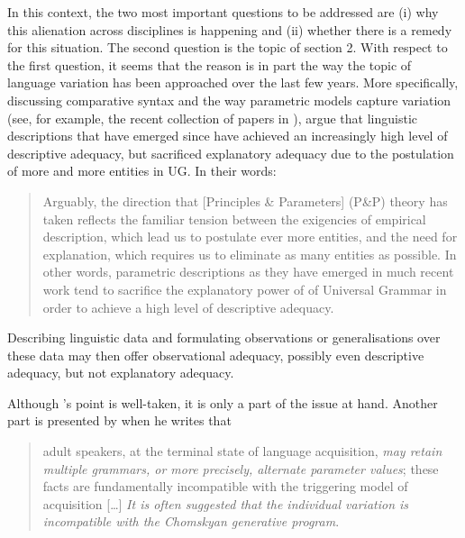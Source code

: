 \documentclass[output=paper]{langsci/langscibook}
\begin{document}
In this context, the two most important questions to be addressed are (i) why
this alienation across disciplines is happening and (ii) whether there is a
remedy for this situation. The second question is the topic of section 2. With
respect to the first question, it seems that the reason is in part the way the
topic of language variation has been approached over the last few years. More
specifically, discussing comparative syntax and the way parametric models
capture variation (see, for example, the recent collection of papers in
\citealt{FábregasEtAl2015}), \citet{BibHolRobShee2014} argue that linguistic
descriptions that have emerged since \citet{Chomsky1981} have achieved an
increasingly high level of descriptive adequacy, but sacrificed explanatory
adequacy due to the postulation of more and more entities in \gls{UG}. In their
words:

\begin{quote}

Arguably, the direction that [Principles \& Parameters] (P\&P) theory has taken
reflects the familiar tension between the exigencies of empirical description,
which lead us to postulate ever more entities, and the need for explanation,
which requires us to eliminate as many entities as possible. In other words,
parametric descriptions as they have emerged in much recent work tend to
sacrifice the explanatory power of  of Universal Grammar in order to
achieve a high level of descriptive adequacy.
\parencite[104]{BibHolRobShee2014}

\end{quote}

Describing linguistic data and formulating observations or generalisations over
these data may then offer observational adequacy, possibly even descriptive
adequacy, but not explanatory adequacy.

Although \citeauthor{BibHolRobShee2014}'s point is well-taken, it is only a
part of the issue at hand. Another part is presented by \citet{Yang2004} when
he writes that

\begin{quote}

adult speakers, at the terminal state of language acquisition, \emph{may retain
    multiple grammars, or more precisely, alternate parameter values}; these
    facts are fundamentally incompatible with the triggering model of
    acquisition [\dots{}] \emph{It is often suggested that the individual
    variation is incompatible with the Chomskyan generative program}.
    \parencite[50--51]{Yang2004}

\end{quote}
\end{document}
